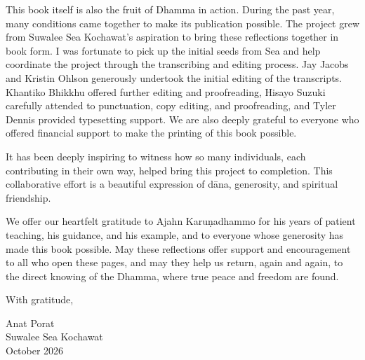This book itself is also the fruit of Dhamma in action. During the past year, many conditions came together to make its publication possible. The project grew from Suwalee Sea Kochawat's aspiration to bring these reflections together in book form. I was fortunate to pick up the initial seeds from Sea and help coordinate the project through the transcribing and editing process. Jay Jacobs and Kristin Ohlson generously undertook the initial editing of the transcripts. Khantiko Bhikkhu offered further editing and proofreading, Hisayo Suzuki carefully attended to punctuation, copy editing, and proofreading, and Tyler Dennis provided typesetting support. We are also deeply grateful to everyone who offered financial support to make the printing of this book possible.

It has been deeply inspiring to witness how so many individuals, each contributing in their own way, helped bring this project to completion. This collaborative effort is a beautiful expression of dāna, generosity, and spiritual friendship.

We offer our heartfelt gratitude to Ajahn Karuṇadhammo for his years of patient teaching, his guidance, and his example, and to everyone whose generosity has made this book possible. May these reflections offer support and encouragement to all who open these pages, and may they help us return, again and again, to the direct knowing of the Dhamma, where true peace and freedom are found.

{\raggedleft
With gratitude,

  Anat Porat\\
  Suwalee Sea Kochawat\\
  October 2026
\par}
